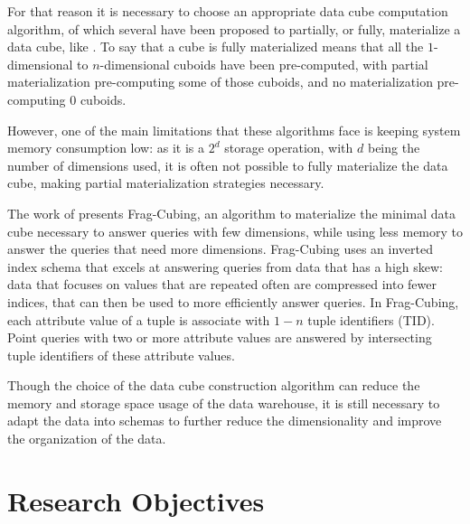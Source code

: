 For that reason it is necessary to choose an appropriate data cube computation algorithm, of which several have been proposed to partially, or fully, materialize a data cube, like \cite{dokaBrownDwarfFullydistributed2011,dongxinCCubingEfficientComputation2006,liSemiClosedCubeEffective2005,liHighdimensionalOLAPMinimal2004,xinComputingIcebergCubes2007}.
To say that a cube is fully materialized means that all the \(1\)-dimensional to \(n\)-dimensional cuboids have been pre-computed, with partial materialization pre-computing some of those cuboids, and no materialization pre-computing $0$ cuboids.

However, one of the main limitations that these algorithms face is keeping system memory consumption low: as it is a $2^d$ storage operation, with $d$ being the number of dimensions used, it is often not possible to fully materialize the data cube, making partial materialization strategies necessary.

The work of  presents Frag-Cubing, an algorithm to materialize the minimal data cube necessary to answer queries with few dimensions, while using less memory to answer the queries that need more dimensions.
Frag-Cubing uses an inverted index schema that excels at answering queries from data that has a high skew: data that focuses on values that are repeated often are compressed into fewer indices, that can then be used to more efficiently answer queries.
In Frag-Cubing, each attribute value of a tuple is associate with $1-n$ tuple identifiers (TID).
Point queries with two or more attribute values are answered by intersecting tuple identifiers of these attribute values.

Though the choice of the data cube construction algorithm can reduce the memory and storage space usage of the data warehouse, it is still necessary to adapt the data into schemas to further reduce the dimensionality and improve the organization of the data.

\section{Research Objectives}\label{ch:intro:obj}


